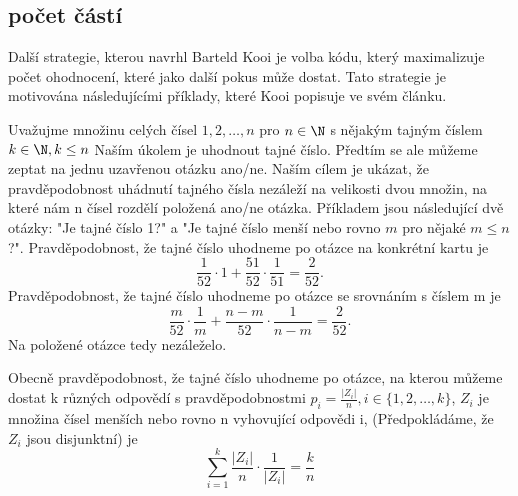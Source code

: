 



\subsection{počet částí}
Další strategie, kterou navrhl Barteld Kooi \cite{kooi} je volba kódu, který maximalizuje počet ohodnocení, které jako další pokus může dostat. Tato strategie je motivována následujícími příklady, které Kooi popisuje ve svém článku. 

\begin{prikl}\label{prdvecasti}
    Uvažujme množinu celých čísel $1,2,\dots, n$ pro $n \in \N $ s nějakým tajným číslem $k \in \N, k\leq n$ Naším úkolem je uhodnout tajné číslo. Předtím se ale můžeme zeptat na jednu uzavřenou otázku ano/ne. Naším cílem je ukázat, že pravděpodobnost uhádnutí tajného čísla nezáleží na velikosti dvou množin, na které nám n čísel rozdělí položená ano/ne otázka. Příkladem jsou následující dvě otázky: "Je tajné číslo 1?" a "Je tajné číslo menší nebo rovno $m$ pro nějaké $m \leq n$?".
    Pravděpodobnost, že tajné číslo uhodneme po otázce na konkrétní kartu je 
    \[\frac{1}{52} \cdot 1 + \frac{51}{52} \cdot \frac{1}{51} = \frac{2}{52}.\] 
    Pravděpodobnost, že tajné číslo uhodneme po otázce se srovnáním s číslem m je 
    \[\frac{m}{52} \cdot \frac{1}{m} + \frac{n-m}{52} \cdot \frac{1}{n-m} = \frac{2}{52}.\] 
    Na položené otázce tedy nezáleželo.
\end{prikl}


Obecně pravděpodobnost, že tajné číslo uhodneme po otázce, na kterou můžeme dostat k různých odpovědí s pravděpodobnostmi $p_i = \frac{|Z_i|}{n}, i \in \{1, 2, \dots, k\}$, $Z_i$ je množina čísel menších nebo rovno n vyhovující odpovědi i, (Předpokládáme, že $Z_i$ jsou disjunktní) je 
\[\sum_{i = 1}^k \frac{|Z_i|}{n} \cdot \frac{1}{|Z_i|} = \frac{k}{n}\]

